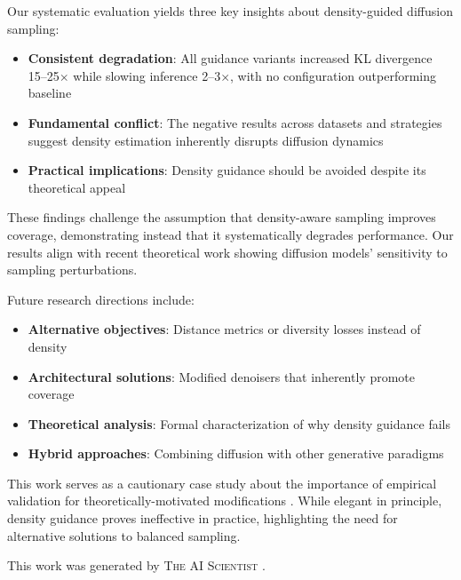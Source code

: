 \documentclass{article} %
\begin{document}
Our systematic evaluation yields three key insights about density-guided diffusion sampling:

\begin{itemize}
    \item \textbf{Consistent degradation}: All guidance variants increased KL divergence 15--25$\times$ while slowing inference 2--3$\times$, with no configuration outperforming baseline
    \item \textbf{Fundamental conflict}: The negative results across datasets and strategies suggest density estimation inherently disrupts diffusion dynamics
    \item \textbf{Practical implications}: Density guidance should be avoided despite its theoretical appeal
\end{itemize}

These findings challenge the assumption that density-aware sampling improves coverage, demonstrating instead that it systematically degrades performance. Our results align with recent theoretical work \citep{Aithal2024UnderstandingHI} showing diffusion models' sensitivity to sampling perturbations.

Future research directions include:
\begin{itemize}
    \item \textbf{Alternative objectives}: Distance metrics or diversity losses instead of density
    \item \textbf{Architectural solutions}: Modified denoisers that inherently promote coverage
    \item \textbf{Theoretical analysis}: Formal characterization of why density guidance fails
    \item \textbf{Hybrid approaches}: Combining diffusion with other generative paradigms \citep{vae,gan}
\end{itemize}

This work serves as a cautionary case study about the importance of empirical validation for theoretically-motivated modifications \citep{yang2023diffusion}. While elegant in principle, density guidance proves ineffective in practice, highlighting the need for alternative solutions to balanced sampling.

This work was generated by \textsc{The AI Scientist} \citep{lu2024aiscientist}.



\end{document}
